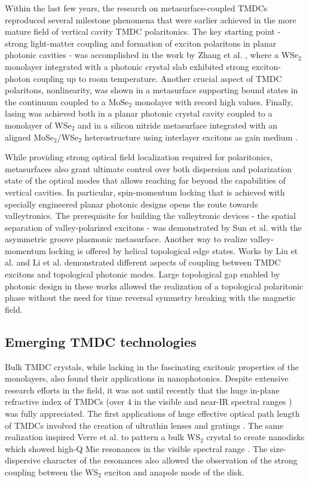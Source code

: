 \documentclass[journal=chreay,manuscript=review]{achemso}
\begin{document}
Within the last few years, the research on metasurface-coupled TMDCs reproduced several milestone phenomena that were earlier achieved in the more mature field of vertical cavity TMDC polaritonics. The key starting point - strong light-matter coupling and formation of exciton polaritons in planar photonic cavities -  was accomplished in the work by Zhang et al. \cite{zhang2018photonic}, where a WSe$_2$ monolayer integrated with a photonic crystal slab exhibited strong exciton-photon coupling up to room temperature. Another crucial aspect of TMDC polaritons, nonlinearity, was shown in a metasurface supporting bound states in the continuum coupled to a MoSe$_2$ monolayer \cite{kravtsov2020nonlinear} with record high values. Finally, lasing was achieved both in a planar photonic crystal cavity coupled to a monolayer of WSe$_2$ \cite{wu2015monolayer} and in a silicon nitride metasurface integrated with an aligned MoSe$_2$/WSe$_2$ heterostructure using interlayer excitons as gain medium \cite{paik2019interlayer}. 

While providing strong optical field localization required for polaritonics, metasurfaces also grant ultimate control over both dispersion and polarization state of the optical modes that allows reaching far beyond the capabilities of vertical cavities. In particular, spin-momentum locking that is achieved with specially engineered planar photonic designs opens the route towards valleytronics. The prerequisite for building the valleytronic devices - the spatial separation of valley-polarized excitons - was demonstrated by Sun et al. \cite{sun2019separation} with the asymmetric groove plasmonic metasurface. Another way to realize valley-momentum locking is offered by helical topological edge states. Works by Liu et al. \cite{liu2020generation} and Li et al. \cite{li2021experimental} demonstrated different aspects of coupling between TMDC excitons and topological photonic modes. Large topological gap enabled by photonic design in these works allowed the realization of a topological polaritonic phase without the need for time reversal symmetry breaking with the magnetic field.

\subsection{Emerging TMDC technologies}

Bulk TMDC crystals, while lacking in the fascinating excitonic properties of the monolayers, also found their applications in nanophotonics. Despite extensive research efforts in the field, it was not until recently that the huge in-plane refractive index of TMDCs (over 4 in the visible and near-IR spectral ranges \cite{beal1979kramers}) was fully appreciated. The first applications of huge effective optical path length of TMDCs involved the creation of ultrathin lenses and gratings \cite{yang2016atomically, liu2018ultrathin}. The same realization inspired Verre et al. to pattern a bulk WS$_2$ crystal to create nanodisks which showed high-Q Mie resonances  in the visible spectral range \cite{verre2019transition}. The size-dispersive character of the resonances also allowed the observation of the strong coupling between the WS$_2$ exciton and anapole mode of the disk.  
\end{document}
